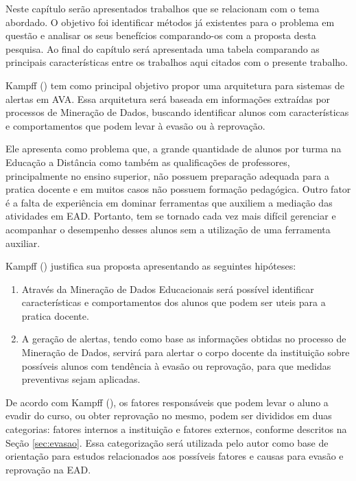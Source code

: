 \label{sec:trabalhosrel}
\iniciocapitulo

Neste capítulo serão apresentados trabalhos que se relacionam com o tema abordado. O objetivo foi identificar métodos já existentes para o problema em questão e analisar os seus benefícios comparando-os com a proposta desta pesquisa. Ao final do capítulo será apresentada uma tabela comparando as principais características entre os trabalhos aqui citados com o presente trabalho.

\label{sec:kampff}

Kampff (\citeyear{kampff2009mineraccao}) tem como principal objetivo propor uma arquitetura para sistemas de alertas em AVA. Essa arquitetura será baseada em informações extraídas por processos de Mineração de Dados, buscando identificar alunos com características e comportamentos que podem levar à evasão ou à reprovação.

Ele apresenta como problema que, a grande quantidade de alunos por turma na Educação a Distância como também as qualificações de professores, principalmente no ensino superior, não possuem preparação adequada para a pratica docente e em muitos casos não possuem formação pedagógica. Outro fator é a falta de experiência em dominar ferramentas que auxiliem a mediação das atividades em EAD. Portanto, tem se tornado cada vez mais difícil gerenciar e acompanhar o desempenho desses alunos sem a utilização de uma ferramenta auxiliar.

Kampff (\citeyear{kampff2009mineraccao}) justifica sua proposta apresentando as seguintes hipóteses:
\begin{enumerate}
\item Através da Mineração de Dados Educacionais será possível identificar características e comportamentos dos alunos que podem ser uteis para a pratica docente.
\item A geração de alertas, tendo como base as informações obtidas no processo de Mineração de Dados, servirá para alertar o corpo docente da instituição sobre possíveis alunos com tendência à evasão ou reprovação, para que medidas preventivas sejam aplicadas.
\end{enumerate}

De acordo com Kampff (\citeyear{kampff2009mineraccao}), os fatores responsáveis que podem levar o aluno a evadir do curso, ou obter reprovação no mesmo, podem ser divididos em duas categorias: fatores internos a instituição e fatores externos, conforme descritos na Seção \ref{sec:evasao}. Essa categorização será utilizada pelo autor como base de orientação para estudos relacionados aos possíveis fatores e causas para evasão e reprovação na EAD.

